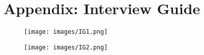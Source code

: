 \chapter{Appendix: Interview Guide}

\begin{figure}
    \centering
    \texttt{[image: images/IG1.png]}
\end{figure}

\begin{figure}
    \centering
    \texttt{[image: images/IG2.png]}
\end{figure}
